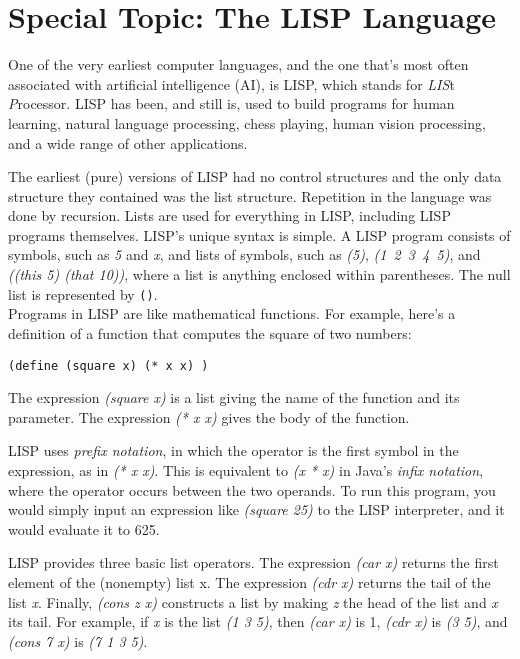 \section*{{\color{cyan}Special Topic:} The LISP Language}

\noindent One of the very earliest computer languages, and the one
that's most often associated with artificial intelligence (AI), is
LISP, which stands for {\it LIS}t {\it P}rocessor.  LISP has been, and
still is, used to build programs for human learning, natural language
processing, chess playing, human vision processing, and a wide range
of other applications.

The earliest (pure) versions of LISP had no control structures and the
only data structure they contained was the list structure.  Repetition
in the language was done by recursion.  Lists are used for everything
in LISP, including LISP programs themselves.  LISP's unique syntax is
simple.  A LISP program consists of symbols, such as {\it 5} and {\it
x}, and lists of symbols, such as {\it (5)}, \mbox{\it (1 2 3 4 5)},
and {\it ((this 5) (that 10))}, where a list is anything enclosed
within parentheses.  The null list is represented by {\tt ()}.\\

Programs in LISP are like mathematical functions.  For example, here's
a definition of a function that computes the square of two numbers:

\begin{jjjlisting}
\begin{lstlisting}
(define (square x) (* x x) )
\end{lstlisting}
\end{jjjlisting}

\noindent The expression {\it (square x)} is a list giving the name of
the function and its parameter.  The expression {\it (* x x)} gives
the body of the function.  

LISP uses {\it prefix notation}, in which the operator is the first
symbol in the expression, as in {\it (* x x)}. This is equivalent to
{\it (x * x)} in Java's {\it infix notation}, where the operator
occurs between the two operands.  To run this program, you would
simply input an expression like {\it (square 25)} to the LISP
interpreter, and it would evaluate it to 625.

LISP provides three basic list operators.  The expression {\it (car
x)} returns the first element of the (nonempty) list x.  The
expression {\it (cdr x)} returns the tail of the list {\it x}.
Finally, {\it (cons z x)} constructs a list by making {\it z} the head
of the list and {\it x} its tail.  For example, if {\it x} is the list
{\it (1 3 5)}, then {\it (car x)} is 1, {\it (cdr x)} is {\it (3 5)},
and {\it (cons 7 x)} is {\it (7 1 3 5)}.  %


